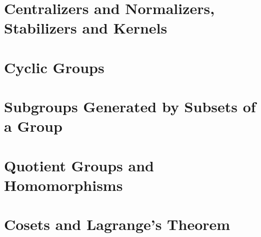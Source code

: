 \documentclass[a4paper, openany]{book}
\begin{document}
\section{Centralizers and Normalizers, Stabilizers and Kernels}

\newpage

\section{Cyclic Groups}

\newpage

\section{Subgroups Generated by Subsets of a Group}

\newpage

\section{Quotient Groups and Homomorphisms}

\newpage

\section{Cosets and Lagrange's Theorem}

\newpage
\end{document}
